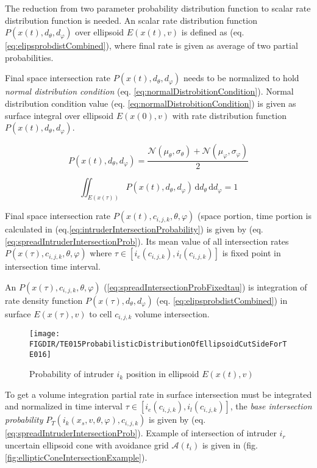 The reduction from two parameter probability distribution function to scalar rate distribution function is needed. An scalar rate distribution  function $P({x}(t),d_\theta,d_\varphi)$ over ellipsoid $E({x}(t),{v})$ is defined as (eq.\ref{eq:elipsprobdistCombined}), where final rate is given as average of two partial probabilities. 

Final space intersection rate $P({x}(t),d_\theta,d_\varphi)$ needs to be normalized to hold \emph{normal distribution condition} (eq. \ref{eq:normalDistrobitionCondition}). Normal distribution condition value (eq. \ref{eq:normalDistrobitionCondition}) is given as surface integral over ellipsoid $E({x}(0),{v})$ with rate distribution function $P({x}(t),d_\theta,d_\varphi)$.

\begin{equation}\label{eq:elipsprobdistCombined}
    P({x}(t),d_\theta,d_\varphi) = \frac{\mathscr{N}(\mu_\theta,\sigma_\theta)+\mathscr{N}(\mu_\varphi,\sigma_\varphi)}{2}
\end{equation}

\begin{equation}\label{eq:normalDistrobitionCondition}
    \iint_{E({x}(\tau))} P({x}(t),d_\theta,d_\varphi) \,\text{d}d_\theta\,\text{d}d_\varphi = 1
\end{equation}

\noindent Final space intersection rate  $P({x}(t),c_{i,j,k},\theta,\varphi)$  (space portion, time portion is calculated in (eq.\ref{eq:intruderIntersectionProbability}) is given by (eq. \ref{eq:spreadIntruderIntersectionProb}). Its mean value of all intersection rates $P({x}(\tau),c_{i,j,k},\theta,\varphi)$ where $\tau\in[i_e(c_{i,j,k}),i_l(c_{i,j,k})]$ is fixed point in intersection time interval.

An $P({x}(\tau),c_{i,j,k},\theta,\varphi)$ (\ref{eq:spreadIntersectionProbFixedtau}) is integration of rate density function $P({x}(\tau),d_\theta,d_\varphi)$ (eq. \ref{eq:elipsprobdistCombined}) in surface $E({x}(\tau),{v})$ to cell $c_{i,j,k}$ volume intersection. 

\begin{figure}[H]
    \centering
    \texttt{[image: \\FIGDIR/TE015ProbabilisticDistributionOfEllipsoidCutSideForTE016]}
    \caption{Probability of intruder $i_k$ position in ellipsoid $E({x}(t),{v})$}
    \label{fig:intruderPassingProbability}
\end{figure}

\noindent To get a volume integration partial rate in surface intersection must be integrated and normalized in time interval $\tau\in[i_e(c_{i,j,k}),i_l(c_{i,j,k})]$, the \emph{base intersection probability} $P_T(i_k({x}_s,{v},\theta,\varphi),c_{i,j,k})$ is given by (eq. \ref{eq:spreadIntruderIntersectionProb}). Example of intersection of intruder $i_r$ uncertain ellipsoid cone with avoidance grid $\mathscr{A}(t_i)$ is given in (fig. \ref{fig:ellipticConeIntersectionExample}).

